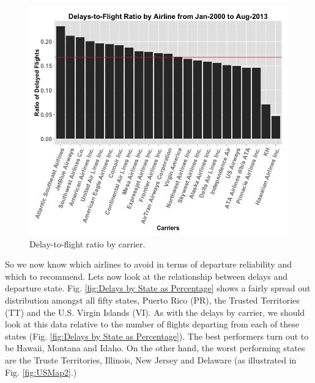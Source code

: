 \documentclass[11pt,twoside,titlepage]{article}
\begin{document}
\begin{figure}[h!]
        \centering
                \includegraphics[width=16cm]{Delayed_by_Airline2.png}
        \caption{Delay-to-flight ratio by carrier.}\label{fig:Delays by Carrier as Percentage}
\end{figure}

So we now know which airlines to avoid in terms of departure reliability and which to recommend. Lets now look at the relationship between delays and departure state. Fig. \ref{fig:Delays by State as Percentage} shows a fairly spread out distribution amongst all fifty states, Puerto Rico (PR), the Trusted Territories (TT) and the U.S. Virgin Islands (VI). As with the delays by carrier, we should look at this data relative to the number of flights departing from each of these states (Fig. \ref{fig:Delays by State as Percentage}). The best performers turn out to be Hawaii, Montana and Idaho. On the other hand, the worst performing states are the Truste Territories, Illinois, New Jersey and Delaware (as illustrated in Fig. \ref{fig:USMap2}.) 
\end{document}
